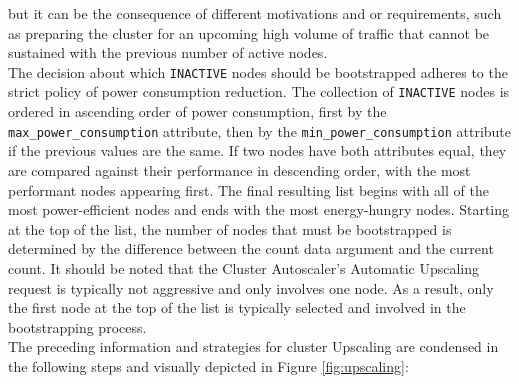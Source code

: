 but it can be the consequence of different motivations and or requirements, such
as preparing the cluster for an upcoming high volume of traffic that cannot be sustained
with the previous number of active nodes. \\ %
The decision about which \texttt{INACTIVE} nodes should be bootstrapped adheres
to the strict policy of power consumption reduction. The collection of \texttt{INACTIVE}
nodes is ordered in ascending order of power consumption, first by the \texttt{max\_power\_consumption}
attribute, then by the \texttt{min\_power\_consumption} attribute if the
previous values are the same. If two nodes have both attributes equal, they are
compared against their performance in descending order, with the most performant
nodes appearing first. The final resulting list begins with all of the most
power-efficient nodes and ends with the most energy-hungry nodes. Starting at the
top of the list, the number of nodes that must be bootstrapped is determined by
the difference between the count data argument and the current count. It should be
noted that the Cluster Autoscaler's Automatic Upscaling request is typically not
aggressive and only involves one node. As a result, only the first node at the top
of the list is typically selected and involved in the bootstrapping process. \\ %
The preceding information and strategies for cluster Upscaling are condensed in the
following steps and visually depicted in Figure \ref{fig:upscaling}:
